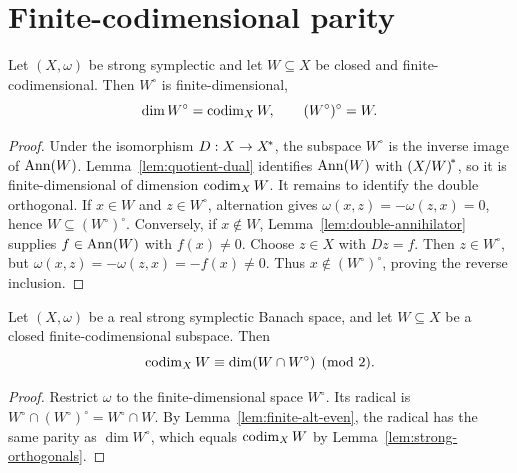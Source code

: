 \section{Finite-codimensional parity}

\begin{lemma}\label{lem:strong-orthogonals}
Let $(X,\omega)$ be strong symplectic and let $W\subseteq X$ be closed and finite-codimensional.
Then $W^\circ$ is finite-dimensional,
\[
  \dim W^\circ=\operatorname{codim}_XW,
  \qquad
  (W^\circ)^\circ=W.
\]
\leanok
\end{lemma}

\begin{proof}
Under the isomorphism $D:X\to{X}^{\!*}$, the subspace $W^\circ$ is the inverse image of
$\operatorname{Ann}(W)$. Lemma~\ref{lem:quotient-dual} identifies $\operatorname{Ann}(W)$ with ${(X/W)}^{\!*}$, so it is
finite-dimensional of dimension $\operatorname{codim}_XW$. It remains to identify the double orthogonal.
If $x\in W$ and $z\in W^\circ$, alternation gives
$\omega(x,z)=-\omega(z,x)=0$, hence $W\subseteq(W^\circ)^\circ$. Conversely, if
$x\notin W$, Lemma~\ref{lem:double-annihilator} supplies $f\in\operatorname{Ann}(W)$ with $f(x)\ne0$.
Choose $z\in X$ with $Dz=f$. Then $z\in W^\circ$, but
$\omega(x,z)=-\omega(z,x)=-f(x)\ne0$. Thus $x\notin(W^\circ)^\circ$, proving the reverse
inclusion.
\end{proof}

\begin{lemma}\label{lem:strong-codim-parity}
Let $(X,\omega)$ be a real strong symplectic Banach space, and let $W\subseteq X$ be a closed
finite-codimensional subspace. Then
\[
  \operatorname{codim}_XW\equiv\dim(W\cap W^\circ)\pmod2.
\]
\leanok
\end{lemma}

\begin{proof}
Restrict $\omega$ to the finite-dimensional space $W^\circ$. Its radical is
$W^\circ\cap(W^\circ)^\circ=W^\circ\cap W$. By
Lemma~\ref{lem:finite-alt-even}, the radical has the same parity as $\dim W^\circ$, which equals
$\operatorname{codim}_XW$ by Lemma~\ref{lem:strong-orthogonals}.
\end{proof}

